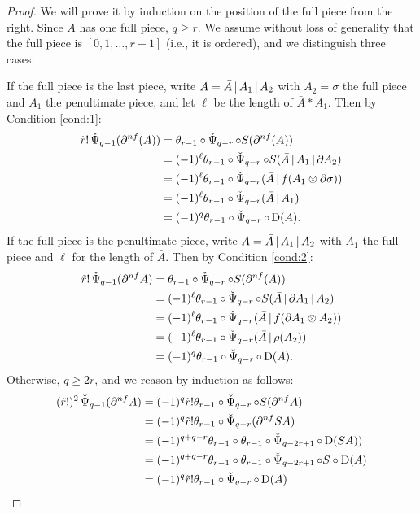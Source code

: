 \begin{proof}
	We will prove it by induction on the position of the full piece from the right. Since $A$ has one full piece, $q\geq r$. We assume without loss of generality that the full piece is $[0,1,\ldots,r-1]$ (i.e., it is ordered), and we distinguish three cases:

	If the full piece is the last piece, write $A=\bar{A}\operatorname{|} A_1\operatorname{|} A_2$ with $A_2 = \sigma$ the full piece and $A_1$ the penultimate piece, and let $\ell$ be the length of $\bar{A}*A_1$. Then by Condition \eqref{cond:1}:
	\begin{align*}
		\tilde{r}!\operatorname{\check{\Psi}}_{q-1}(\partial^{nf} (A)) &=
		\theta_{r-1} \circ \operatorname{\check{\Psi}}_{q-r}\circ S (\partial^{nf}(A)) \\
		&= (-1)^{\ell} \theta_{r-1}\circ\operatorname{\check{\Psi}}_{q-r}\circ S(\bar{A}\operatorname{|} A_1\operatorname{|} \partial A_2) \\
		&= (-1)^{\ell} \theta_{r-1}\circ\operatorname{\check{\Psi}}_{q-r}(\bar{A}\operatorname{|} f(A_1\otimes \partial \sigma)) \\
		&= (-1)^{\ell} \theta_{r-1}\circ\operatorname{\check{\Psi}}_{q-r}(\bar{A}\operatorname{|} A_1) \\
		&= (-1)^q\theta_{r-1}\circ \operatorname{\check{\Psi}}_{q-r}\circ\operatorname{D}(A).
	\end{align*}
	If the full piece is the penultimate piece, write $A=\bar{A}\operatorname{|} A_1\operatorname{|} A_2$ with $A_1$ the full piece and $\ell$ for the length of $\bar{A}$. Then by Condition \eqref{cond:2}:
	\begin{align*}
		\tilde{r}!\operatorname{\check{\Psi}}_{q-1}(\partial^{nf} A) &=
		\theta_{r-1}\circ \operatorname{\check{\Psi}}_{q-r}\circ S(\partial^{nf}(A)) \\
		&= (-1)^{\ell} \theta_{r-1}\circ \operatorname{\check{\Psi}}_{q-r}\circ S(\bar{A}\operatorname{|} \partial A_1\operatorname{|}  A_2) \\
		&= (-1)^{\ell} \theta_{r-1}\circ \operatorname{\check{\Psi}}_{q-r}(\bar{A}\operatorname{|} f(\partial A_1\otimes A_2)) \\
		&= (-1)^{\ell} \theta_{r-1}\circ \operatorname{\check{\Psi}}_{q-r}(\bar{A}\operatorname{|} \rho(A_2)) \\
		&= (-1)^q\theta_{r-1}\circ \operatorname{\check{\Psi}}_{q-r}\circ \operatorname{D}(A).
	\end{align*}
	Otherwise, $q\geq 2r$, and we reason by induction as follows: %
	\begin{align*}
		(\tilde{r}!)^2\operatorname{\check{\Psi}}_{q-1}(\partial^{nf} A)
		&= (-1)^q\tilde{r}!\theta_{r-1}\circ \operatorname{\check{\Psi}}_{q-r}\circ S(\partial^{nf} A) \\
		&= (-1)^q\tilde{r}!\theta_{r-1}\circ \operatorname{\check{\Psi}}_{q-r}(\partial^{nf} SA) \\
		&= (-1)^{q+q-r}\theta_{r-1}\circ \theta_{r-1}\circ \operatorname{\check{\Psi}}_{q-2r+1}\circ \operatorname{D} (SA)) \\
		&= (-1)^{q+q-r}\theta_{r-1}\circ \theta_{r-1}\circ \operatorname{\check{\Psi}}_{q-2r+1}\circ S\circ \operatorname{D} (A) \\
		&= (-1)^{q}\tilde{r}!\theta_{r-1}\circ \operatorname{\check{\Psi}}_{q-r}\circ \operatorname{D} (A)\qedhere
	\end{align*}
\end{proof}








